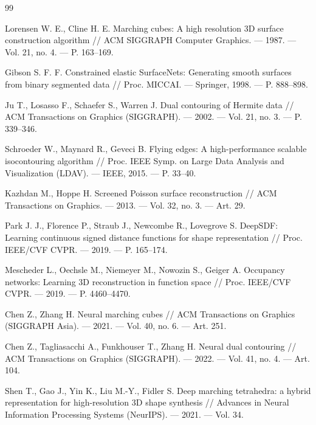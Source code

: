 \documentclass[a4paper,14pt]{article}
\begin{document}
\renewcommand{\refname}{Список литературы}
\begin{thebibliography}{99}

 Lorensen W. E., Cline H. E. Marching cubes: A high resolution 3D surface construction algorithm // ACM SIGGRAPH Computer Graphics. --- 1987. --- Vol. 21, no. 4. --- P. 163--169.

 Gibson S. F. F. Constrained elastic SurfaceNets: Generating smooth surfaces from binary segmented data // Proc. MICCAI. --- Springer, 1998. --- P. 888--898.

 Ju T., Losasso F., Schaefer S., Warren J. Dual contouring of Hermite data // ACM Transactions on Graphics (SIGGRAPH). --- 2002. --- Vol. 21, no. 3. --- P. 339--346.

 Schroeder W., Maynard R., Geveci B. Flying edges: A high-performance scalable isocontouring algorithm // Proc. IEEE Symp. on Large Data Analysis and Visualization (LDAV). --- IEEE, 2015. --- P. 33--40.

 Kazhdan M., Hoppe H. Screened Poisson surface reconstruction // ACM Transactions on Graphics. --- 2013. --- Vol. 32, no. 3. --- Art. 29.

 Park J. J., Florence P., Straub J., Newcombe R., Lovegrove S. DeepSDF: Learning continuous signed distance functions for shape representation // Proc. IEEE/CVF CVPR. --- 2019. --- P. 165--174.

 Mescheder L., Oechsle M., Niemeyer M., Nowozin S., Geiger A. Occupancy networks: Learning 3D reconstruction in function space // Proc. IEEE/CVF CVPR. --- 2019. --- P. 4460--4470.

 Chen Z., Zhang H. Neural marching cubes // ACM Transactions on Graphics (SIGGRAPH Asia). --- 2021. --- Vol. 40, no. 6. --- Art. 251.

 Chen Z., Tagliasacchi A., Funkhouser T., Zhang H. Neural dual contouring // ACM Transactions on Graphics (SIGGRAPH). --- 2022. --- Vol. 41, no. 4. --- Art. 104.

 Shen T., Gao J., Yin K., Liu M.-Y., Fidler S. Deep marching tetrahedra: a hybrid representation for high-resolution 3D shape synthesis // Advances in Neural Information Processing Systems (NeurIPS). --- 2021. --- Vol. 34.


\end{thebibliography}
\end{document}
